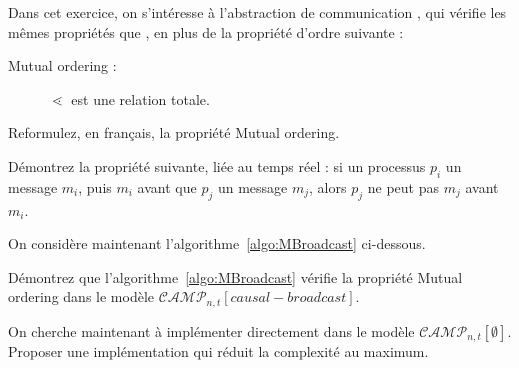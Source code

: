 \begin{exercice}
  
  Dans cet exercice, on s'intéresse à l'abstraction de communication ,
  qui vérifie les mêmes propriétés que , en plus de la propriété d'ordre suivante : 
  \begin{description}
  \item[Mutual ordering :] $\lessdot$ est une relation totale. 
  \end{description}

  \begin{questions}
    \item Reformulez, en français, la propriété Mutual ordering. 
  \item Démontrez la propriété suivante, liée au temps réel : si un processus $p_i$  un message $m_i$,
    puis  $m_i$ avant que $p_j$  un message $m_j$, alors $p_j$ ne peut pas  $m_j$ avant $m_i$. 
  \end{questions}

  On considère maintenant l'algorithme~\ref{algo:MBroadcast} ci-dessous.
  
  \begin{algorithm}[H]
    \caption{mutual-broadcast dans le modèle $\mathcal{CAMP}_{n, t}[causal-broadcast]$ (code pour $p_i$)}
    \label{algo:MBroadcast}
  \end{algorithm}

  \begin{questions}
  \item Démontrez que l'algorithme~\ref{algo:MBroadcast} vérifie la propriété Mutual ordering dans le modèle \linebreak $\mathcal{CAMP}_{n, t}[causal-broadcast]$.
  \item On cherche maintenant à implémenter directement  dans le modèle  $\mathcal{CAMP}_{n, t}[\emptyset]$.
    Proposer une implémentation qui réduit la complexité au maximum. 
  \end{questions}
\end{exercice}

\endgroup
\endinput
